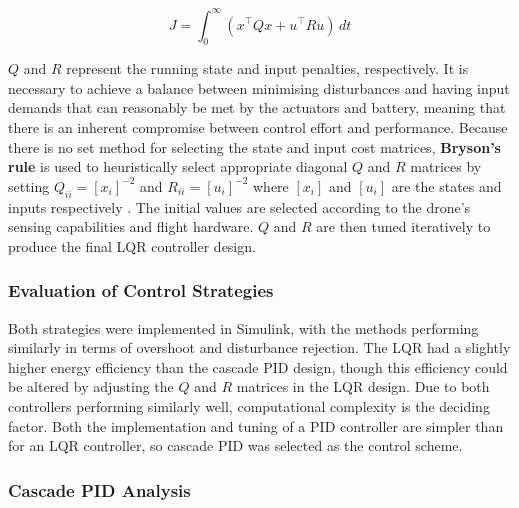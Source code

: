 \begin{equation} \label{eq:cost_function}
J = \int_0^\infty \left( x^\top Q x + u^\top R u \right) \, dt 
\end{equation}

$Q$ and $R$ represent the running state and input penalties, respectively. It is necessary to achieve a balance between minimising disturbances and having input demands that can reasonably be met by the actuators and battery, meaning that there is an inherent compromise between control effort and performance. Because there is no set method for selecting the state and input cost matrices, \textbf{Bryson's rule} is used to heuristically select appropriate diagonal $Q$ and $R$ matrices by setting $Q_{ii} = { [x_i]^{-2} }$ and $R_{ii} = { [u_i]^{-2} }$ where $[x_i]$ and $[u_i]$ are the states and inputs respectively \cite{chibum2014adv09designofsfb1}. The initial values are selected according to the drone's sensing capabilities and flight hardware. $Q$ and $R$ are then tuned iteratively to produce the final LQR controller design.

\subsubsection{Evaluation of Control Strategies}

Both strategies were implemented in Simulink, with the methods performing similarly in terms of overshoot and disturbance rejection. The \gls{LQR} had a slightly higher energy efficiency than the cascade \gls{PID} design, though this efficiency could be altered by adjusting the $Q$ and $R$ matrices in the \gls{LQR} design. Due to both controllers performing similarly well, computational complexity is the deciding factor. Both the implementation and tuning of a \gls{PID} controller are simpler than for an \gls{LQR} controller, so cascade \gls{PID} was selected as the control scheme.

\subsubsection{Cascade PID Analysis}
\label{sec:cascpid}

